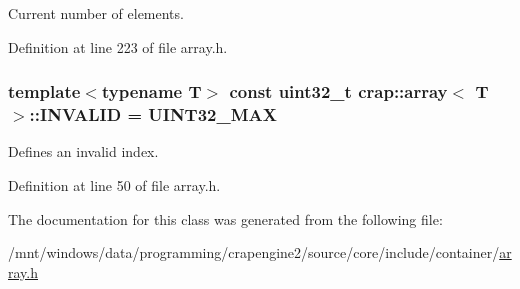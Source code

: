 Current number of elements. 



Definition at line 223 of file array.\+h.

\hypertarget{classcrap_1_1array_a9ad63bb5c848f0ba7ebef098a8b3a6ab}{}
\subsubsection[{I\+N\+V\+A\+L\+I\+D}]{\setlength{\rightskip}{0pt plus 5cm}template$<$typename T$>$ const uint32\+\_\+t {\bf crap\+::array}$<$ T $>$\+::I\+N\+V\+A\+L\+I\+D = {\bf U\+I\+N\+T32\+\_\+\+M\+A\+X}\hspace{0.3cm}{\ttfamily [static]}}\label{classcrap_1_1array_a9ad63bb5c848f0ba7ebef098a8b3a6ab}


Defines an invalid index. 



Definition at line 50 of file array.\+h.



The documentation for this class was generated from the following file\+:\begin{DoxyCompactItemize}
\item 
/mnt/windows/data/programming/crapengine2/source/core/include/container/\hyperlink{array_8h}{array.\+h}\end{DoxyCompactItemize}
